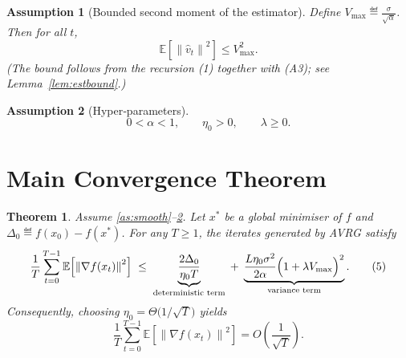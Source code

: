 \documentclass{article}
\newtheorem{theorem}{Theorem}
\newtheorem{assumption}{Assumption}
\newcommand{\E}{\mathbb{E}}
\newcommand{\norm}[1]{\left\|#1\right\|}
\newcommand{\grad}{\nabla}
\begin{document}
\begin{assumption}[Bounded second moment of the estimator]\label{as:estbound}
Define $V_{\max}\eqdef \frac{\sigma}{\sqrt{\alpha}}$. Then for all $t$,
\[
\E\!\left[\norm{\hat v_{t}}^{2}\right]\le V_{\max}^{2}.
\tag{A4}
\]
(The bound follows from the recursion (1) together with (A3); see Lemma~\ref{lem:estbound}.) 
\end{assumption}

\begin{assumption}[Hyper‑parameters]\label{as:params}
\[
0<\alpha<1,\qquad \eta_{0}>0,\qquad \lambda\ge 0.
\tag{A5}
\]
\end{assumption}

\section*{Main Convergence Theorem}
\begin{theorem}\label{thm:main}
Assume \ref{as:smooth}–\ref{as:params}. Let $x^{*}$ be a global minimiser of $f$ and
$ \Delta_{0}\eqdef f(x_{0})-f(x^{*})$. For any $T\ge 1$, the iterates generated by
AVRG satisfy
\[
\frac{1}{T}\sum_{t=0}^{T-1}\E\!\left[\norm{\grad f(x_{t})}^{2}\right]
\;\le\;
\underbrace{\frac{2\Delta_{0}}{\eta_{0}T}}_{\text{deterministic term}}
\;+\;
\underbrace{ \frac{L\eta_{0}\sigma^{2}}{2\alpha}\Bigl(1+\lambda V_{\max}\Bigr)^{2}}_{\text{variance term}} .
\tag{5}
\]
Consequently, choosing $\eta_{0}= \Theta\!\bigl(1/\sqrt{T}\bigr)$ yields
\[
\frac{1}{T}\sum_{t=0}^{T-1}\E\!\left[\norm{\grad f(x_{t})}^{2}\right]
=O\!\left(\frac{1}{\sqrt{T}}\right).
\]
\end{theorem}
\end{document}
